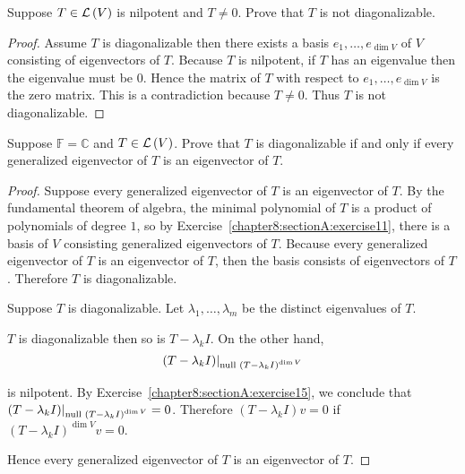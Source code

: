 \begin{exercise}\label{chapter8:sectionA:exercise14}
    Suppose $T\in\mathcal{L}\left({V}\right)$ is nilpotent and $T\ne 0$. Prove that $T$ is not diagonalizable.
\end{exercise}

\begin{proof}
    Assume $T$ is diagonalizable then there exists a basis $e_{1}, \ldots, e_{\dim V}$ of $V$ consisting of eigenvectors of $T$. Because $T$ is nilpotent, if $T$ has an eigenvalue then the eigenvalue must be $0$. Hence the matrix of $T$ with respect to $e_{1}, \ldots, e_{\dim V}$ is the zero matrix. This is a contradiction because $T\ne 0$. Thus $T$ is not diagonalizable.
\end{proof}
\newpage

\begin{exercise}\label{chapter8:sectionA:exercise15}
    Suppose $\mathbb{F} = \mathbb{C}$ and $T\in\mathcal{L}\left({V}\right)$. Prove that $T$ is diagonalizable if and only if every generalized eigenvector of $T$ is an eigenvector of $T$.
\end{exercise}

\begin{proof}
    Suppose every generalized eigenvector of $T$ is an eigenvector of $T$. By the fundamental theorem of algebra, the minimal polynomial of $T$ is a product of polynomials of degree $1$, so by Exercise~\ref{chapter8:sectionA:exercise11}, there is a basis of $V$ consisting generalized eigenvectors of $T$. Because every generalized eigenvector of $T$ is an eigenvector of $T$, then the basis consists of eigenvectors of $T$. Therefore $T$ is diagonalizable.

    \bigskip
    Suppose $T$ is diagonalizable. Let $\lambda_{1}, \ldots, \lambda_{m}$ be the distinct eigenvalues of $T$.

    $T$ is diagonalizable then so is $T - \lambda_{k}I$. On the other hand,
    \[
        {(T - \lambda_{k}I)}\vert_{\operatorname{null}\,{(T - \lambda_{k}I)}^{\dim V}}
    \]

    is nilpotent. By Exercise~\ref{chapter8:sectionA:exercise15}, we conclude that ${(T - \lambda_{k}I)}\vert_{\operatorname{null}\,{(T - \lambda_{k}I)}^{\dim V}} = 0$. Therefore $(T - \lambda_{k}I)v = 0$ if ${(T - \lambda_{k}I)}^{\dim V}v = 0$.

    Hence every generalized eigenvector of $T$ is an eigenvector of $T$.
\end{proof}
\newpage

